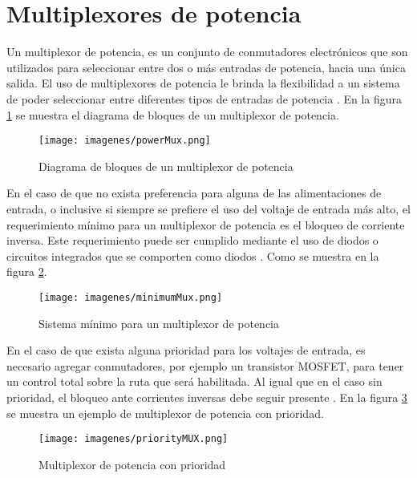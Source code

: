 \section{Multiplexores de potencia}

Un multiplexor de potencia, es un conjunto de conmutadores electrónicos que son utilizados
para seleccionar entre dos o más entradas de potencia, hacia una única salida. El uso de 
multiplexores de potencia le brinda la flexibilidad a un sistema de poder seleccionar
entre diferentes tipos de entradas de potencia \cite{triano_basics_2020}. En la figura 
\ref{fig:powerMux} se muestra el diagrama de bloques de un multiplexor de potencia.


\begin{figure}[H]
    \centering
    \texttt{[image: imagenes/powerMux.png]}
    \caption{Diagrama de bloques de un multiplexor de potencia \cite{triano_basics_2020}}
    \label{fig:powerMux}
\end{figure}


En el caso de que no exista preferencia para alguna de las alimentaciones de entrada, o inclusive
si siempre se prefiere el uso del voltaje de entrada más alto, el requerimiento mínimo para un multiplexor
de potencia es el bloqueo de corriente inversa. Este requerimiento puede ser cumplido mediante el uso de 
diodos o circuitos integrados que se comporten como diodos \cite{triano_basics_2020}.  Como se muestra en la figura \ref{fig:muxDiode}.

\begin{figure}[H]
    \centering
    \texttt{[image: imagenes/minimumMux.png]}
    \caption{Sistema mínimo para un multiplexor de potencia \cite{triano_basics_2020}}
    \label{fig:muxDiode}
\end{figure}

En el caso de que exista alguna prioridad para los voltajes de entrada, es necesario agregar conmutadores,
por ejemplo un transistor MOSFET, para tener un control total sobre la ruta que será habilitada. Al igual que
en el caso sin prioridad, el bloqueo ante corrientes inversas debe seguir presente \cite{triano_basics_2020}. En la figura \ref{fig:priorityMux} se muestra un ejemplo de multiplexor de potencia con prioridad.

\begin{figure}[H]
    \centering
    \texttt{[image: imagenes/priorityMUX.png]}
    \caption{Multiplexor de potencia con prioridad \cite{triano_basics_2020}}
    \label{fig:priorityMux}
\end{figure}

